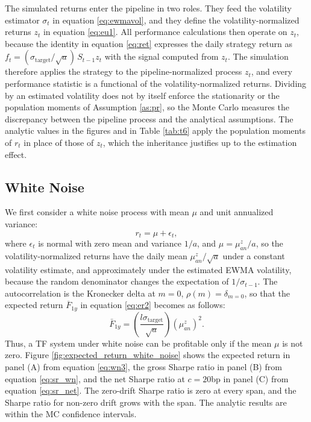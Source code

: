 \documentclass[hidelinks]{siamonline250211}
\begin{document}
The simulated returns enter the pipeline in two roles. They feed the volatility estimator $\sigma_{t}$ in equation \eqref{eq:ewmavol}, and they define the volatility-normalized returns $z_{t}$ in equation \eqref{eq:eu1}. All performance calculations then operate on $z_{t}$, because the identity in equation \eqref{eq:ret} expresses the daily strategy return as $f_{t} = (\sigma_{\mathrm{target}}/\sqrt{a})\, S_{t-1} z_{t}$ with the signal computed from $z_{t}$. The simulation therefore applies the strategy to the pipeline-normalized process $z_{t}$, and every performance statistic is a functional of the volatility-normalized returns. Dividing by an estimated volatility does not by itself enforce the stationarity or the population moments of Assumption \ref{as:pr}, so the Monte Carlo measures the discrepancy between the pipeline process and the analytical assumptions. The analytic values in the figures and in Table \ref{tab:t6} apply the population moments of $r_{t}$ in place of those of $z_{t}$, which the inheritance justifies up to the estimation effect.


\subsection{White Noise}

We first consider a white noise process with mean $\mu$ and unit annualized variance:
\begin{equation} \label{eq:wn1} 
	r_{t} = \mu + \epsilon_{t},
\end{equation}
where $\epsilon_{t}$ is normal with zero mean and variance $1/a$, and $\mu=\mu^{z}_{an}/a$, so the volatility-normalized returns have the daily mean $\mu^{z}_{an}/\sqrt{a}$ under a constant volatility estimate, and approximately under the estimated EWMA volatility, because the random denominator changes the expectation of $1/\sigma_{t-1}$. The autocorrelation is the Kronecker delta at $m=0$, $\rho(m) = \delta_{m=0}$, so that the expected return $\overline{F}_{1y}$ in equation \eqref{eq:er2} becomes as follows:
\begin{equation} \label{eq:wn3} 
	\bar{F}_{1y} = \left( \frac{l\sigma_{\mathrm{target}} }{\sqrt{a}} \right)   (\mu^{z}_{an})^{2}.
\end{equation}
Thus, a TF system under white noise can be profitable only if the mean $\mu$ is not zero. Figure \ref{fig:expected_return_white_noise} shows the expected return in panel (A) from equation \eqref{eq:wn3}, the gross Sharpe ratio in panel (B) from equation \eqref{eq:sr_wn}, and the net Sharpe ratio at $c=20$bp in panel (C) from equation \eqref{eq:sr_net}. The zero-drift Sharpe ratio is zero at every span, and the Sharpe ratio for non-zero drift grows with the span. The analytic results are within the MC confidence intervals.
\end{document}
